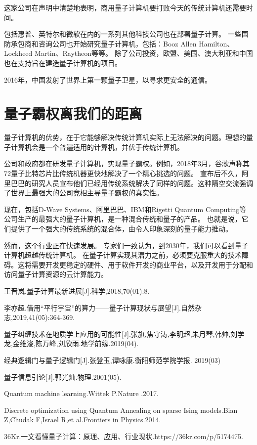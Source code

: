 \documentclass{hfutpaper}
\begin{document}
这家公司在声明中清楚地表明，商用量子计算机要打败今天的传统计算机还需要时间。

包括惠普、英特尔和微软在内的一系列其他科技公司也在部署量子计算。
一些国防承包商和咨询公司也开始研究量子计算机，包括：Booz Allen Hamilton、Lockheed Martin、Raytheon等等。
除了公司投资，欧盟、美国、澳大利亚和中国也在支持旨在建造量子计算机的项目。

2016年，中国发射了世界上第一颗量子卫星，以寻求更安全的通信。

\section{量子霸权离我们的距离}

量子计算机的优势，在于它能够解决传统计算机实际上无法解决的问题。理想的量子计算机会是一个普遍适用的计算机，并优于传统计算机。

公司和政府都在研发量子计算机，实现量子霸权。例如，2018年3月，谷歌声称其72量子比特芯片比传统机器更快地解决了一个精心挑选的问题。
宣布后不久，阿里巴巴的研究人员宣布他们已经用传统系统解决了同样的问题。这种隔空交流强调了世界上最强大的公司竞相主导量子霸权的真实性。

现在，包括D-Wave Systems、阿里巴巴、IBM和Rigetti Quantum Computing等公司生产的最强大的量子计算机，是一种混合传统和量子的产品。
也就是说，它们提供了一个强大的传统系统的混合体，由令人印象深刻的量子能力推动。

然而，这个行业正在快速发展。 专家们一致认为，到2030年，我们可以看到量子计算机超越传统计算机。
在量子计算实现其潜力之前，必须要克服重大的技术障碍。这将需要开发更稳定的硬件、用于软件开发的商业平台，以及开发用于分配和访问量子计算资源的云计算能力。

\begin{thebibliography}{9}%
王晋岚.量子计算最新进展[J].科学,2018,70(01):8.

李亦超.借用“平行宇宙”的算力——量子计算现状与展望[J].自然杂志,2019,41(05):364-369.

量子纠缠技术在地质学上应用的可能性[J].张旗,焦守涛,李明超,朱月琴,韩帅,刘学龙,金维浚,陈万峰,刘欣雨.地学前缘.2019(04).

经典逻辑门与量子逻辑门[J].张登玉,谭咏康.衡阳师范学院学报. 2019(03)

量子信息引论[J].郭光灿.物理.2001(05).

Quantum machine learning.Wittek P.Nature .2017.

Discrete optimization using Quantum Annealing on sparse Ising models.Bian Z,Chudak F,Israel R,et al.Frontiers in Physics.2014.

36Kr.一文看懂量子计算：原理、应用、行业现状.https://36kr.com/p/5174475.
\end{thebibliography}
\iffalse
\section*{matlab源程序}
\begin{lstlisting}[language=matlab]
clc;clear;
row = size(A) 
row = size(A,1) 
column = size(A,2) 
[row,column] = size(A) 
\end{lstlisting}
\fi
\end{document}
